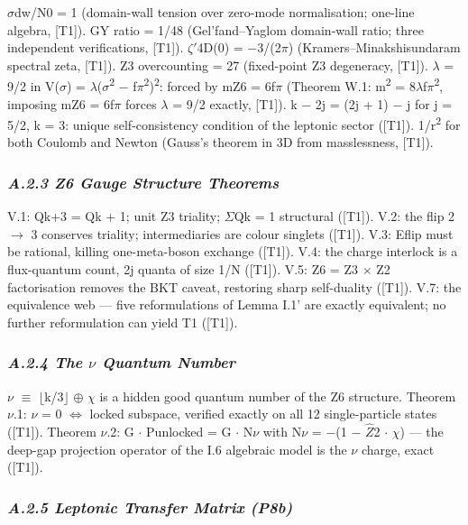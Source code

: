 \documentclass[11pt,letterpaper]{article}
\begin{document}
\noindent $\sigma$dw/N0 = 1 (domain-wall tension over zero-mode normalisation; one-line algebra, [T1]). GY ratio = 1/48 (Gel'fand--Yaglom domain-wall ratio; three independent verifications, [T1]). $\zeta$$'$4D(0) = $-$3/(2$\pi$) (Kramers--Minakshisundaram spectral zeta, [T1]). Z3 overcounting = 27 (fixed-point Z3 degeneracy, [T1]). $\lambda$ = 9/2 in V($\sigma$) = $\lambda$($\sigma$\textsuperscript{2} $-$ f$\pi$\textsuperscript{2})\textsuperscript{2}: forced by mZ6 = 6f$\pi$ (Theorem W.1: m\textsuperscript{2} = 8$\lambda$f$\pi$\textsuperscript{2}, imposing mZ6 = 6f$\pi$ forces $\lambda$ = 9/2 exactly, [T1]). k $-$ 2j = (2j + 1) $-$ j for j = 5/2, k = 3: unique self-consistency condition of the leptonic sector ([T1]). 1/r\textsuperscript{2} for both Coulomb and Newton (Gauss's theorem in 3D from masslessness, [T1]).

\subsubsection*{\itshape A.2.3  Z6 Gauge Structure Theorems}

\noindent V.1: Qk+3 = Qk + 1; unit Z3 triality; $\Sigma$Qk = 1 structural ([T1]). V.2: the flip 2 $\to$ 3 conserves triality; intermediaries are colour singlets ([T1]). V.3: Eflip must be rational, killing one-meta-boson exchange ([T1]). V.4: the charge interlock is a flux-quantum count, 2j quanta of size 1/N ([T1]). V.5: Z6 = Z3 $\times$ Z2 factorisation removes the BKT caveat, restoring sharp self-duality ([T1]). V.7: the equivalence web --- five reformulations of Lemma I.1' are exactly equivalent; no further reformulation can yield T1 ([T1]).

\subsubsection*{\itshape A.2.4  The $\nu$ Quantum Number}

\noindent $\nu$ $\equiv$ $\lfloor$k/3$\rfloor$ $\oplus$ $\chi$ is a hidden good quantum number of the Z6 structure. Theorem $\nu$.1: $\nu$ = 0 $\Leftrightarrow$ locked subspace, verified exactly on all 12 single-particle states ([T1]). Theorem $\nu$.2: G $\cdot$ Punlocked = G $\cdot$ N$\nu$ with N$\nu$ = $-$(1 $-$ $\hat{Z}$2 $\cdot$ $\chi$) --- the deep-gap projection operator of the I.6 algebraic model is the $\nu$ charge, exact ([T1]).

\subsubsection*{\itshape A.2.5  Leptonic Transfer Matrix (P8b)}
\end{document}
